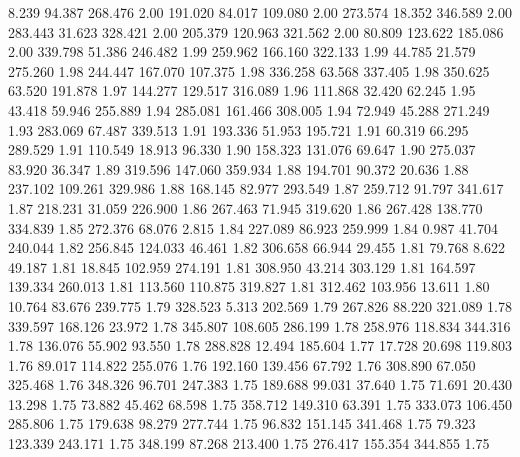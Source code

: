    8.239   94.387  268.476         2.00
 191.020   84.017  109.080         2.00
 273.574   18.352  346.589         2.00
 283.443   31.623  328.421         2.00
 205.379  120.963  321.562         2.00
  80.809  123.622  185.086         2.00
 339.798   51.386  246.482         1.99
 259.962  166.160  322.133         1.99
  44.785   21.579  275.260         1.98
 244.447  167.070  107.375         1.98
 336.258   63.568  337.405         1.98
 350.625   63.520  191.878         1.97
 144.277  129.517  316.089         1.96
 111.868   32.420   62.245         1.95
  43.418   59.946  255.889         1.94
 285.081  161.466  308.005         1.94
  72.949   45.288  271.249         1.93
 283.069   67.487  339.513         1.91
 193.336   51.953  195.721         1.91
  60.319   66.295  289.529         1.91
 110.549   18.913   96.330         1.90
 158.323  131.076   69.647         1.90
 275.037   83.920   36.347         1.89
 319.596  147.060  359.934         1.88
 194.701   90.372   20.636         1.88
 237.102  109.261  329.986         1.88
 168.145   82.977  293.549         1.87
 259.712   91.797  341.617         1.87
 218.231   31.059  226.900         1.86
 267.463   71.945  319.620         1.86
 267.428  138.770  334.839         1.85
 272.376   68.076    2.815         1.84
 227.089   86.923  259.999         1.84
   0.987   41.704  240.044         1.82
 256.845  124.033   46.461         1.82
 306.658   66.944   29.455         1.81
  79.768    8.622   49.187         1.81
  18.845  102.959  274.191         1.81
 308.950   43.214  303.129         1.81
 164.597  139.334  260.013         1.81
 113.560  110.875  319.827         1.81
 312.462  103.956   13.611         1.80
  10.764   83.676  239.775         1.79
 328.523    5.313  202.569         1.79
 267.826   88.220  321.089         1.78
 339.597  168.126   23.972         1.78
 345.807  108.605  286.199         1.78
 258.976  118.834  344.316         1.78
 136.076   55.902   93.550         1.78
 288.828   12.494  185.604         1.77
  17.728   20.698  119.803         1.76
  89.017  114.822  255.076         1.76
 192.160  139.456   67.792         1.76
 308.890   67.050  325.468         1.76
 348.326   96.701  247.383         1.75
 189.688   99.031   37.640         1.75
  71.691   20.430   13.298         1.75
  73.882   45.462   68.598         1.75
 358.712  149.310   63.391         1.75
 333.073  106.450  285.806         1.75
 179.638   98.279  277.744         1.75
  96.832  151.145  341.468         1.75
  79.323  123.339  243.171         1.75
 348.199   87.268  213.400         1.75
 276.417  155.354  344.855         1.75
